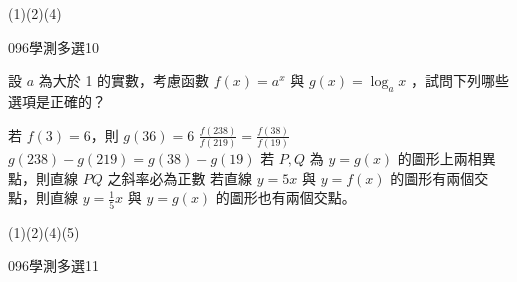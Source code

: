 \begin{QUESTIONS}
\begin{QUESTION}
        \begin{QTAGS}\end{QTAGS}
        \begin{QANS}
            (1)(2)(4)
        \end{QANS}
        \begin{QSOLLIST}
        \end{QSOLLIST}
        \begin{QEMPTYSPACE}
        \end{QEMPTYSPACE}
    \end{QUESTION}
    \begin{QUESTION}
        \begin{ExamInfo}{096}{學測}{多選}{10}
        \end{ExamInfo}
        \begin{ExamAnsRateInfo}{28}{52}{21}{11}
        \end{ExamAnsRateInfo}
        \begin{QBODY}
			設 $a$ 為大於 1 的實數，考慮函數 $f (x) = a^x$ 與 $g(x) = \log_a x$ ，試問下列哪些選項是正確的？ 
			\begin{QOPS} 
				\QOP 若 $f(3)=6$，則 $g(36)=6$ 
				\QOP $\frac{f (238)}{f(219)} = \frac{f (38)}{ f (19)}$ 
				\QOP $g(238)-g(219)= g(38)-g(19)$ 
				\QOP  若 $P, Q$ 為 $y = g(x)$ 的圖形上兩相異點，則直線 $PQ$ 之斜率必為正數 
				\QOP 若直線 $y=5x$ 與 $y= f(x)$ 的圖形有兩個交點，則直線 $y = \frac{1}{5}x$ 與 $y=g(x)$ 的圖形也有兩個交點。
			\end{QOPS}
        \end{QBODY}
        \begin{QFROMS}
        \end{QFROMS}
        \begin{QTAGS}\end{QTAGS}
        \begin{QANS}
            (1)(2)(4)(5)
        \end{QANS}
        \begin{QSOLLIST}
        \end{QSOLLIST}
        \begin{QEMPTYSPACE}
        \end{QEMPTYSPACE}
    \end{QUESTION}
    \begin{QUESTION}
        \begin{ExamInfo}{096}{學測}{多選}{11}
        \end{ExamInfo}
        \begin{ExamAnsRateInfo}{22}{35}{16}{15}

\end{ExamAnsRateInfo}
\end{QUESTION}
\end{QUESTIONS}
